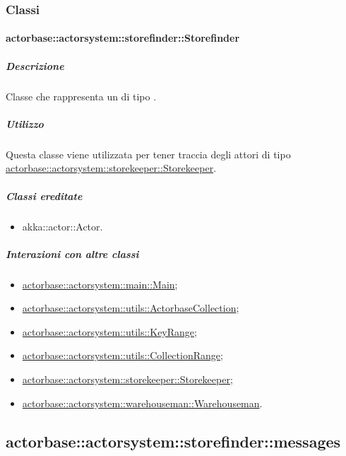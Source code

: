 \documentclass{scalatekids-article}
\begin{document}
\subsubsection{Classi}

\paragraph{actorbase::actorsystem::storefinder::Storefinder}
\label{sec:actorbase::actorsystem::storefinder::Storefinder}

\subparagraph{Descrizione}

Classe che rappresenta un  di tipo .

\subparagraph{Utilizzo}
Questa classe viene utilizzata per tener traccia degli attori di tipo
\hyperref[sec:actorbase::actorsystem::storekeeper::Storekeeper]{actorbase::actorsystem::storekeeper::Storekeeper}.

\subparagraph{Classi ereditate}

\begin{itemize}

\item akka::actor::Actor.

\end{itemize}

\subparagraph{Interazioni con altre classi}
\begin{itemize}
\item \hyperref[sec:actorbase::actorsystem::main::Main]{actorbase::actorsystem::main::Main};
\item \hyperref[sec:actorbase::actorsystem::utils::ActorbaseCollection]{actorbase::actorsystem::utils::ActorbaseCollection};
\item \hyperref[sec:actorbase::actorsystem::utils::KeyRange]{actorbase::actorsystem::utils::KeyRange};
\item \hyperref[sec:actorbase::actorsystem::utils::CollectionRange]{actorbase::actorsystem::utils::CollectionRange};
\item \hyperref[sec:actorbase::actorsystem::storekeeper::Storekeeper]{actorbase::actorsystem::storekeeper::Storekeeper};
\item \hyperref[sec:actorbase::actorsystem::warehouseman::Warehouseman]{actorbase::actorsystem::warehouseman::Warehouseman}.
\end{itemize}

\subsection{actorbase::actorsystem::storefinder::messages}
\label{sec:actorbase::actorsystem::storefinder::messages}
\end{document}
